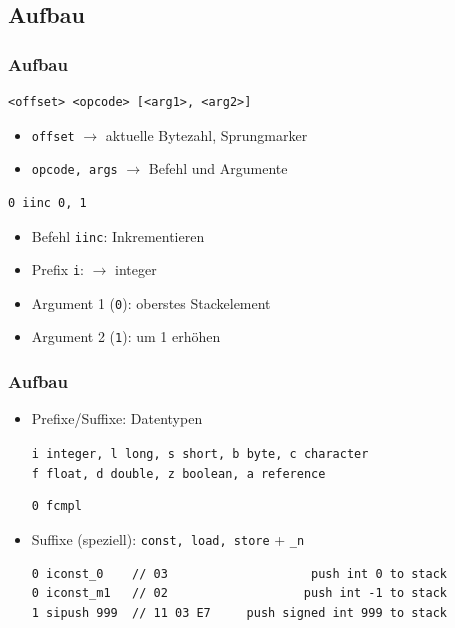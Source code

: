 \documentclass[10pt]{beamer}
\begin{document}
\subsection{Aufbau}
\begin{frame}[fragile]
\frametitle{Aufbau}
\begin{Verbatim}[frame=single]
<offset> <opcode> [<arg1>, <arg2>]
\end{Verbatim}
\begin{itemize}
\item {\tt offset} $\rightarrow$ aktuelle Bytezahl, Sprungmarker
\item {\tt opcode, args} $\rightarrow$ Befehl und Argumente
\end{itemize}

\pause
\begin{Verbatim}[frame=single]
0 iinc 0, 1
\end{Verbatim}
\begin{itemize}
\item Befehl {\tt iinc}: Inkrementieren
\item Prefix {\tt i}: $\rightarrow$ integer
\item Argument 1 ({\tt 0}): oberstes Stackelement
\item Argument 2 ({\tt 1}): um 1 erhöhen
\end{itemize}
\end{frame}


\begin{frame}[fragile]
\frametitle{Aufbau}
\begin{itemize}
\item Prefixe/Suffixe: Datentypen

{\tt {\btt i}  integer, {\btt l} long, {\btt s} short, {\btt b} byte, {\btt c} character\\
{\btt f} float, {\btt d} double, {\btt z} boolean, {\btt a} reference}

\begin{Verbatim}[frame=single]
0 fcmpl
\end{Verbatim}
\pause

\item Suffixe (speziell): {\tt const, load, store} + {\tt \_n}

\begin{Verbatim}[frame=single]
0 iconst_0    // 03                    push int 0 to stack
0 iconst_m1   // 02                   push int -1 to stack
1 sipush 999  // 11 03 E7     push signed int 999 to stack
\end{Verbatim}
\end{itemize}
\end{frame}
\end{document}
